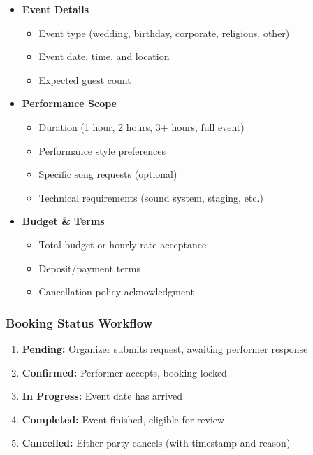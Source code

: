 \documentclass[11pt,a4paper]{article}
\begin{document}
\begin{itemize}[leftmargin=1.5em]
  \item \textbf{Event Details}
    \begin{itemize}[leftmargin=1.5em]
      \item Event type (wedding, birthday, corporate, religious, other)
      \item Event date, time, and location
      \item Expected guest count
    \end{itemize}
  \item \textbf{Performance Scope}
    \begin{itemize}[leftmargin=1.5em]
      \item Duration (1 hour, 2 hours, 3+ hours, full event)
      \item Performance style preferences
      \item Specific song requests (optional)
      \item Technical requirements (sound system, staging, etc.)
    \end{itemize}
  \item \textbf{Budget \& Terms}
    \begin{itemize}[leftmargin=1.5em]
      \item Total budget or hourly rate acceptance
      \item Deposit/payment terms
      \item Cancellation policy acknowledgment
    \end{itemize}
\end{itemize}

\subsubsection{Booking Status Workflow}
\begin{enumerate}[leftmargin=1.5em]
  \item \textbf{Pending:} Organizer submits request, awaiting performer response
  \item \textbf{Confirmed:} Performer accepts, booking locked
  \item \textbf{In Progress:} Event date has arrived
  \item \textbf{Completed:} Event finished, eligible for review
  \item \textbf{Cancelled:} Either party cancels (with timestamp and reason)
\end{enumerate}
\end{document}

